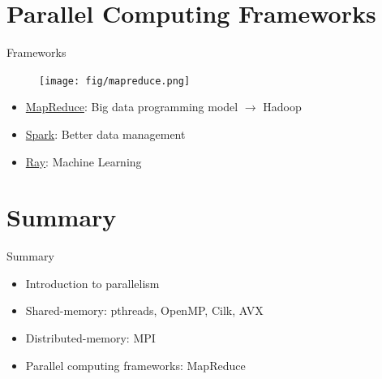 \documentclass{../TexTemplate/myslide}
\begin{document}
\section{Parallel Computing Frameworks}
\begin{frame}
\sectionpage
\end{frame}

\begin{frame}{Frameworks}
\begin{figure}
\centering
\texttt{[image: fig/mapreduce.png]}
\end{figure}
\begin{itemize}
\item \href{https://www.tutorialspoint.com/hadoop/hadoop_mapreduce.htm}{MapReduce}: Big data programming model $\to$ Hadoop
\item \href{https://spark.apache.org}{Spark}: Better data management
\item \href{https://rise.cs.berkeley.edu/projects/ray/}{Ray}: Machine Learning
\end{itemize}
\end{frame}

\section{Summary}
\begin{frame}
\sectionpage
\end{frame}

\begin{frame}{Summary}
\begin{itemize}
	\item Introduction to parallelism
	\item Shared-memory: pthreads, OpenMP, Cilk, AVX
	\item Distributed-memory: MPI
	\item Parallel computing frameworks: MapReduce
\end{itemize}
\end{frame}
\end{document}
